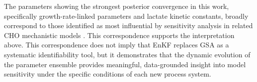 {The parameters showing the strongest posterior convergence in this work, specifically growth-rate-linked parameters and lactate kinetic constants, broadly correspond to those identified as most influential by sensitivity analysis in related CHO mechanistic models \cite{Kotidis2019UseCultures}. This correspondence supports the interpretation above. This correspondence does not imply that EnKF replaces GSA as a systematic identifiability tool, but it demonstrates that the dynamic evolution of the parameter ensemble provides meaningful, data-grounded insight into model sensitivity under the specific conditions of each new process system.
}
